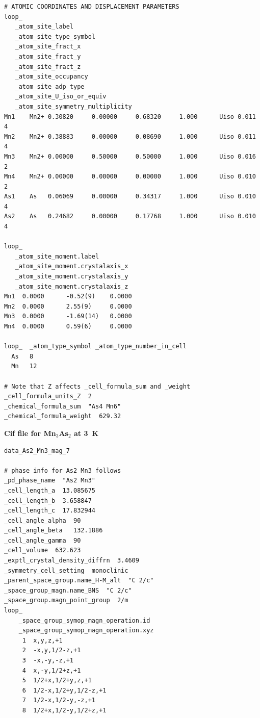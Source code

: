 \documentclass[10pt,doublespacing,edeposit]{uiucthesis2020}
\begin{document}
\begin{mainmatter}
\begin{verbatim}
# ATOMIC COORDINATES AND DISPLACEMENT PARAMETERS
loop_ 
   _atom_site_label
   _atom_site_type_symbol
   _atom_site_fract_x
   _atom_site_fract_y
   _atom_site_fract_z
   _atom_site_occupancy
   _atom_site_adp_type
   _atom_site_U_iso_or_equiv
   _atom_site_symmetry_multiplicity
Mn1    Mn2+ 0.30820     0.00000     0.68320     1.000      Uiso 0.011      4   
Mn2    Mn2+ 0.38883     0.00000     0.08690     1.000      Uiso 0.011      4   
Mn3    Mn2+ 0.00000     0.50000     0.50000     1.000      Uiso 0.016      2   
Mn4    Mn2+ 0.00000     0.00000     0.00000     1.000      Uiso 0.010      2   
As1    As   0.06069     0.00000     0.34317     1.000      Uiso 0.010      4   
As2    As   0.24682     0.00000     0.17768     1.000      Uiso 0.010      4   

loop_
   _atom_site_moment.label
   _atom_site_moment.crystalaxis_x
   _atom_site_moment.crystalaxis_y
   _atom_site_moment.crystalaxis_z
Mn1  0.0000      -0.52(9)    0.0000      
Mn2  0.0000      2.55(9)     0.0000      
Mn3  0.0000      -1.69(14)   0.0000      
Mn4  0.0000      0.59(6)     0.0000      

loop_  _atom_type_symbol _atom_type_number_in_cell
  As   8
  Mn   12

# Note that Z affects _cell_formula_sum and _weight
_cell_formula_units_Z  2
_chemical_formula_sum  "As4 Mn6"
_chemical_formula_weight  629.32

\end{verbatim}

\vspace{1em}
\begin{center}
\textbf{Cif file for Mn$_3$As$_2$ at 3~K}\\
\end{center}
\normalsize

\begin{verbatim}
data_As2_Mn3_mag_7

# phase info for As2 Mn3 follows
_pd_phase_name  "As2 Mn3"
_cell_length_a  13.085675
_cell_length_b  3.658847
_cell_length_c  17.832944
_cell_angle_alpha  90
_cell_angle_beta   132.1886
_cell_angle_gamma  90
_cell_volume  632.623
_exptl_crystal_density_diffrn  3.4609
_symmetry_cell_setting  monoclinic
_parent_space_group.name_H-M_alt  "C 2/c"
_space_group_magn.name_BNS  "C 2/c"
_space_group.magn_point_group  2/m
loop_
    _space_group_symop_magn_operation.id
    _space_group_symop_magn_operation.xyz
     1  x,y,z,+1
     2  -x,y,1/2-z,+1
     3  -x,-y,-z,+1
     4  x,-y,1/2+z,+1
     5  1/2+x,1/2+y,z,+1
     6  1/2-x,1/2+y,1/2-z,+1
     7  1/2-x,1/2-y,-z,+1
     8  1/2+x,1/2-y,1/2+z,+1


\end{verbatim}
\end{mainmatter}
\end{document}
